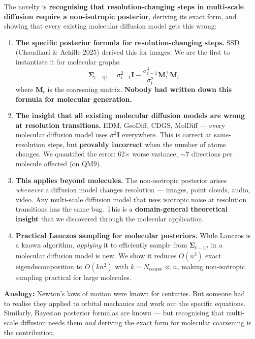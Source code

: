 \documentclass[12pt,a4paper]{article}
\begin{document}
\begin{tcolorbox}[
  colback=novelty!5, colframe=novelty!80!black,
  fonttitle=\bfseries\large, title={What IS new (MolSSD's actual contribution)},
  top=3mm, bottom=3mm
]
The novelty is \textbf{recognising that resolution-changing steps in multi-scale diffusion require a non-isotropic posterior}, deriving its exact form, and showing that every existing molecular diffusion model gets this wrong:

\begin{enumerate}[leftmargin=*, itemsep=4pt]
  \item \textbf{The specific posterior formula for resolution-changing steps.} SSD (Chaudhari \& Achille 2025) derived this for images. We are the first to instantiate it for molecular graphs:
  \[
  \bm{\Sigma}_{t-1|t} = \sigma_{t-1}^2 \bm{I} - \frac{\sigma_{t-1}^4}{\sigma_t^2} \bm{M}_t^\top \bm{M}_t
  \]
  where $\bm{M}_t$ is the coarsening matrix. \textbf{Nobody had written down this formula for molecular generation.}

  \item \textbf{The insight that all existing molecular diffusion models are wrong at resolution transitions.} EDM, GeoDiff, CDGS, MolDiff --- every molecular diffusion model uses $\sigma^2 \bm{I}$ everywhere. This is correct at same-resolution steps, but \textbf{provably incorrect} when the number of atoms changes. We quantified the error: 62$\times$ worse variance, $\sim$7 directions per molecule affected (on QM9).

  \item \textbf{This applies beyond molecules.} The non-isotropic posterior arises \emph{whenever} a diffusion model changes resolution --- images, point clouds, audio, video. Any multi-scale diffusion model that uses isotropic noise at resolution transitions has the same bug. This is a \textbf{domain-general theoretical insight} that we discovered through the molecular application.

  \item \textbf{Practical Lanczos sampling for molecular posteriors.} While Lanczos is a known algorithm, \emph{applying} it to efficiently sample from $\bm{\Sigma}_{t-1|t}$ in a molecular diffusion model is new. We show it reduces $O(n^3)$ exact eigendecomposition to $O(kn^2)$ with $k = N_{\text{coarse}} \ll n$, making non-isotropic sampling practical for large molecules.
\end{enumerate}

\textbf{Analogy:} Newton's laws of motion were known for centuries. But someone had to realise they applied to orbital mechanics and work out the specific equations. Similarly, Bayesian posterior formulas are known --- but recognising that multi-scale diffusion needs them \emph{and} deriving the exact form for molecular coarsening is the contribution.
\end{tcolorbox}
\end{document}
